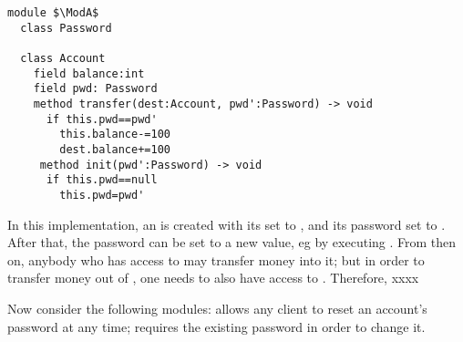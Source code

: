 \begin{lstlisting}[mathescape=true, language=Chainmail, frame=lines]
module $\ModA$        
  class Password
  
  class Account
    field balance:int 
    field pwd: Password
    method transfer(dest:Account, pwd':Password) -> void
      if this.pwd==pwd'
        this.balance-=100
        dest.balance+=100
     method init(pwd':Password) -> void
      if this.pwd==null
        this.pwd=pwd'
\end{lstlisting}
%
\noindent 
%
 
 In this implementation, an  is created with its  set to , and its password set to .
 After that, the password can be set to a new value, eg by executing   . 
 From then on, anybody who has access to  may transfer money into it; but in order to transfer money out of , one needs to
 also have access to . Therefore, xxxx 
 
 \vspace{.1cm}
 
Now consider the following modules:
\ModB allows any client to reset an account's password at any time;
\ModC requires the existing password in order to change it.
  
  

